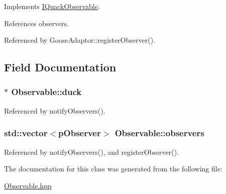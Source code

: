 Implements \hyperlink{classIQuackObservable_ac2c11f51db71de4ec1facfe6e562f3bc}{I\-Quack\-Observable}.



References observers.



Referenced by Goose\-Adaptor\-::register\-Observer().



\subsection{Field Documentation}
\hypertarget{classObservable_ae1a02e816895e53c27e3229666756a2c}{
\subsubsection[{duck}]{$\ast$ Observable\-::duck}}\label{classObservable_ae1a02e816895e53c27e3229666756a2c}


Referenced by notify\-Observers().

\hypertarget{classObservable_aabdb218af3f0e4e48d0c3bfa03069801}{
\subsubsection[{observers}]{\setlength{\rightskip}{0pt plus 5cm}std\-::vector$<$p\-Observer$>$ Observable\-::observers}}\label{classObservable_aabdb218af3f0e4e48d0c3bfa03069801}


Referenced by notify\-Observers(), and register\-Observer().



The documentation for this class was generated from the following file\-:\begin{DoxyCompactItemize}
\item 
\hyperlink{Observable_8hpp}{Observable.\-hpp}\end{DoxyCompactItemize}
